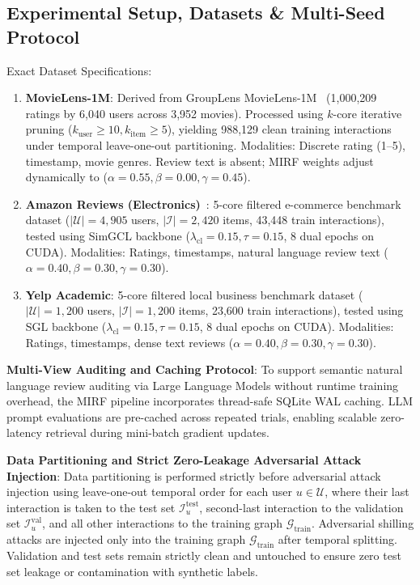 \documentclass[10pt,journal]{IEEEtran}
\begin{document}
\subsection{Experimental Setup, Datasets \& Multi-Seed Protocol}
Exact Dataset Specifications:
\begin{enumerate}
    \item \textbf{MovieLens-1M}: Derived from GroupLens MovieLens-1M~\cite{harper2015movielens} (1,000,209 ratings by 6,040 users across 3,952 movies). Processed using $k$-core iterative pruning ($k_{\text{user}} \ge 10, k_{\text{item}} \ge 5$), yielding 988,129 clean training interactions under temporal leave-one-out partitioning. Modalities: Discrete rating (1--5), timestamp, movie genres. Review text is absent; MIRF weights adjust dynamically to ($\alpha = 0.55, \beta = 0.00, \gamma = 0.45$).
    \item \textbf{Amazon Reviews (Electronics)}~\cite{ni2019justifying}: 5-core filtered e-commerce benchmark dataset ($|\mathcal{U}| = 4,905$ users, $|\mathcal{I}| = 2,420$ items, 43,448 train interactions), tested using SimGCL backbone ($\lambda_{\text{cl}} = 0.15, \tau = 0.15$, 8 dual epochs on CUDA). Modalities: Ratings, timestamps, natural language review text ($\alpha = 0.40, \beta = 0.30, \gamma = 0.30$).
    \item \textbf{Yelp Academic}: 5-core filtered local business benchmark dataset ($|\mathcal{U}| = 1,200$ users, $|\mathcal{I}| = 1,200$ items, 23,600 train interactions), tested using SGL backbone ($\lambda_{\text{cl}} = 0.15, \tau = 0.15$, 8 dual epochs on CUDA). Modalities: Ratings, timestamps, dense text reviews ($\alpha = 0.40, \beta = 0.30, \gamma = 0.30$).
\end{enumerate}

\textbf{Multi-View Auditing and Caching Protocol}: To support semantic natural language review auditing via Large Language Models without runtime training overhead, the MIRF pipeline incorporates thread-safe SQLite WAL caching. LLM prompt evaluations are pre-cached across repeated trials, enabling scalable zero-latency retrieval during mini-batch gradient updates.

\textbf{Data Partitioning and Strict Zero-Leakage Adversarial Attack Injection}: Data partitioning is performed strictly before adversarial attack injection using leave-one-out temporal order for each user $u \in \mathcal{U}$, where their last interaction is taken to the test set $\mathcal{I}_u^{\text{test}}$, second-last interaction to the validation set $\mathcal{I}_u^{\text{val}}$, and all other interactions to the training graph $\mathcal{G}_{\text{train}}$. Adversarial shilling attacks are injected only into the training graph $\mathcal{G}_{\text{train}}$ after temporal splitting. Validation and test sets remain strictly clean and untouched to ensure zero test set leakage or contamination with synthetic labels.
\end{document}
